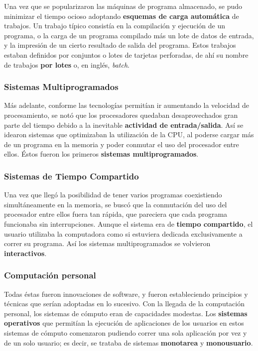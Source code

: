 \documentclass[spanish,A4,]{article}
\begin{document}
Una vez que se popularizaron las máquinas de programa almacenado, se
pudo minimizar el tiempo ocioso adoptando \textbf{esquemas de carga
automática} de trabajos. Un trabajo típico consistía en la compilación y
ejecución de un programa, o la carga de un programa compilado más un
lote de datos de entrada, y la impresión de un cierto resultado de
salida del programa. Estos trabajos estaban definidos por conjuntos o
lotes de tarjetas perforadas, de ahí su nombre de trabajos \textbf{por
lotes} o, en inglés, \emph{batch}.

\subsubsection{Sistemas
Multiprogramados}\label{sistemas-multiprogramados}

Más adelante, conforme las tecnologías permitían ir aumentando la
velocidad de procesamiento, se notó que los procesadores quedaban
desaprovechados gran parte del tiempo debido a la inevitable
\textbf{actividad de entrada/salida}. Así se idearon sistemas que
optimizaban la utilización de la CPU, al poderse cargar más de un
programa en la memoria y poder conmutar el uso del procesador entre
ellos. Éstos fueron los primeros \textbf{sistemas multiprogramados}.

\subsubsection{Sistemas de Tiempo
Compartido}\label{sistemas-de-tiempo-compartido}

Una vez que llegó la posibilidad de tener varios programas coexistiendo
simultáneamente en la memoria, se buscó que la conmutación del uso del
procesador entre ellos fuera tan rápida, que pareciera que cada programa
funcionaba sin interrupciones. Aunque el sistema era de \textbf{tiempo
compartido}, el usuario utilizaba la computadora como si estuviera
dedicada exclusivamente a correr su programa. Así los sistemas
multiprogramados se volvieron \textbf{interactivos}.

\subsubsection{Computación personal}\label{computaciuxf3n-personal}

Todas éstas fueron innovaciones de software, y fueron estableciendo
principios y técnicas que serían adoptadas en lo sucesivo. Con la
llegada de la computación personal, los sistemas de cómputo eran de
capacidades modestas. Los \textbf{sistemas operativos} que permitían la
ejecución de aplicaciones de los usuarios en estos sistemas de cómputo
comenzaron pudiendo correr una sola aplicación por vez y de un solo
usuario; es decir, se trataba de sistemas \textbf{monotarea} y
\textbf{monousuario}.
\end{document}
